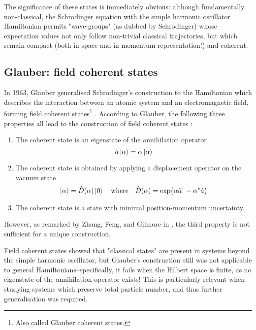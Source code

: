 The significance of these states is immediately obvious: although fundamentally non-classical, the Schrodinger equation with the simple harmonic oscillator Hamiltonian permits "wave-groups" (as dubbed by Schrodinger) whose expectation values not only follow non-trivial classical trajectories, but which remain compact (both in space and in momentum representation!) and coherent.
	
\subsection{Glauber: field coherent states}
In 1963, Glauber generalised Schrodinger's construction to the Hamiltonian which describes the interaction between an atomic system and an electromagnetic field, forming field coherent states\footnote{Also called Glauber coherent states.} \cite{field_coherent_states}. According to Glauber, the following three properties all lead to the construction of field coherent states \cite[p. 869]{ZFG}:
\begin{enumerate}
	\item The coherent state is an eigenstate of the annihilation operator
	\begin{equation}
	\hat{a}\ket{\alpha}=\alpha\ket{\alpha}
	\end{equation}
	\item The coherent state is obtained by applying a displacement operator on the vacuum state
	\begin{equation}
	\ket{\alpha}=\hat{D}(\alpha)\ket{0}\qq{where} \hat{D}(\alpha)=\exp(\alpha\hat{a}\hc-\alpha^*\hat{a})
	\end{equation}
	\item The coherent state is a state with minimal position-momentum uncertainty.
\end{enumerate}
However, as remarked by Zhang, Feng, and Gilmore in \cite{ZFG}, the third property is not sufficient for a unique construction.

Field coherent states showed that "classical states" are present in systems beyond the simple harmonic oscillator, but Glauber's construction still was not applicable to general Hamiltonians--specifically, it fails when the Hilbert space is finite, as no eigenstate of the annihilation operator exists! This is particularly relevant when studying systems which preserve total particle number, and thus further generalisation was required.
	
